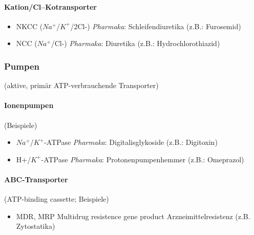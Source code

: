 \documentclass[10pt,a4paper]{report}
\begin{document}
\paragraph{Kation/Cl--Kotransporter}
\begin{itemize}
	\item NKCC ($Na^+$/$K^+$/2Cl-)	\textit{Pharmaka}: Schleifendiuretika (z.B.: Furosemid)
	\item NCC ($Na^+$/Cl-)		\textit{Pharmaka}: Diuretika (z.B.: Hydrochlorothiazid)
\end{itemize} 
\subsubsection{Pumpen} (aktive, primär ATP-verbrauchende Transporter)\\
\paragraph{Ionenpumpen} (Beispiele)
\begin{itemize}
	\item $Na^+$/$K^+$-ATPase 	\textit{Pharmaka}: Digitalisglykoside (z.B.: Digitoxin)
	\item H+/$K^+$-ATPase		\textit{Pharmaka}: Protonenpumpenhemmer (z.B.: Omeprazol)
\end{itemize}
\paragraph{ABC-Transporter} (ATP-binding cassette; Beispiele)
\begin{itemize}
	\item MDR, MRP		Multidrug resistence gene product Arzneimittelresistenz (z.B. Zytostatika)	
\end{itemize}
\end{document}
